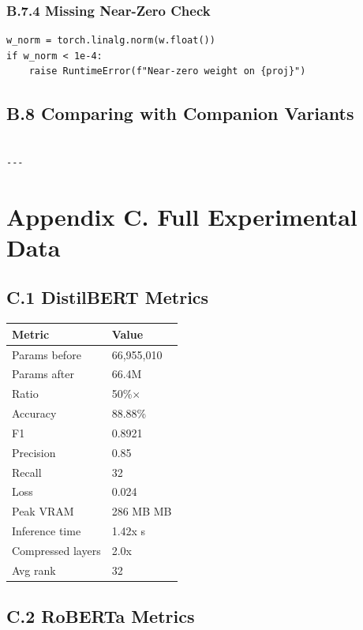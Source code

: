 \subsubsection{B.7.4 Missing Near-Zero Check}

\begin{lstlisting}
w_norm = torch.linalg.norm(w.float())
if w_norm < 1e-4:
    raise RuntimeError(f"Near-zero weight on {proj}")
\end{lstlisting}

\subsection{B.8 Comparing with Companion Variants}

\begin{lstlisting}

---
\end{lstlisting}


\section{Appendix C. Full Experimental Data}

\subsection{C.1 DistilBERT Metrics}

\begin{table}[H]
\centering
\small
\begin{tabular}{ll}
\toprule
\textbf{Metric} & \textbf{Value} \\
\midrule
Params before & 66,955,010 \\
Params after & 66.4M \\
Ratio & 50\%$\times$ \\
Accuracy & 88.88\% \\
F1 & 0.8921 \\
Precision & 0.85 \\
Recall & 32 \\
Loss & 0.024 \\
Peak VRAM & 286 MB MB \\
Inference time & 1.42x s \\
Compressed layers & 2.0x \\
Avg rank & 32 \\
\bottomrule
\end{tabular}
\end{table}

\subsection{C.2 RoBERTa Metrics}

